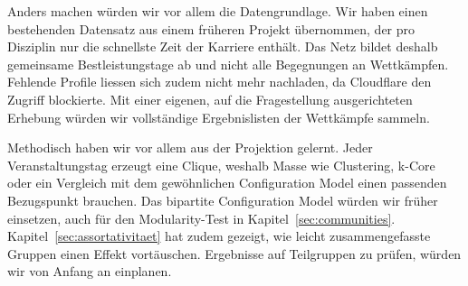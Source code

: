 Anders machen würden wir vor allem die Datengrundlage. Wir haben einen
bestehenden Datensatz aus einem früheren Projekt übernommen, der pro
Disziplin nur die schnellste Zeit der Karriere enthält. Das Netz bildet
deshalb gemeinsame Bestleistungstage ab und nicht alle Begegnungen an
Wettkämpfen. Fehlende Profile liessen sich zudem nicht mehr nachladen, da
Cloudflare den Zugriff blockierte. Mit einer eigenen, auf die Fragestellung
ausgerichteten Erhebung würden wir vollständige Ergebnislisten der
Wettkämpfe sammeln.

Methodisch haben wir vor allem aus der Projektion gelernt. Jeder
Veranstaltungstag erzeugt eine Clique, weshalb Masse wie Clustering, k-Core
oder ein Vergleich mit dem gewöhnlichen Configuration Model einen passenden
Bezugspunkt brauchen. Das bipartite Configuration Model würden wir früher
einsetzen, auch für den Modularity-Test in Kapitel~\ref{sec:communities}.
Kapitel~\ref{sec:assortativitaet} hat zudem gezeigt, wie leicht
zusammengefasste Gruppen einen Effekt vortäuschen. Ergebnisse auf
Teilgruppen zu prüfen, würden wir von Anfang an einplanen.

